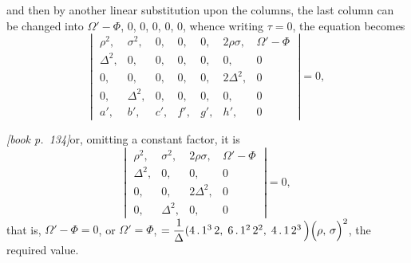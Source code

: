 \documentclass[11pt,a4paper]{article}
\theoremstyle{plain}
\theoremstyle{definition}
\theoremstyle{remark}
\begin{document}
and then by another linear substitution upon the columns, the last column can be changed into $\Omega' - \Phi$, $0$, $0$, $0$, $0$, $0$, whence writing $\tau = 0$, the equation becomes
\[
\left|\;\begin{array}{ccccccc}
\rho^{2},  & \sigma^{2}, & 0, & 0, & 0, & 2\rho\sigma, & \Omega' - \Phi\\
\Delta^{2}, & 0,         & 0, & 0, & 0, & 0,           & 0\\
0,         & 0,          & 0, & 0, & 0, & 2\Delta^{2}, & 0\\
0,         & \Delta^{2}, & 0, & 0, & 0, & 0,           & 0\\
a',        & b',         & c',& f',& g',& h',          & 0
\end{array}\;\right| = 0,
\]

\medskip\noindent\textit{[book p.~134]}\quad or, omitting a constant factor, it is
\[
\left|\;\begin{array}{cccc}
\rho^{2}, & \sigma^{2}, & 2\rho\sigma, & \Omega' - \Phi\\
\Delta^{2}, & 0, & 0, & 0\\
0, & 0, & 2\Delta^{2}, & 0\\
0, & \Delta^{2}, & 0, & 0
\end{array}\;\right| = 0,
\]
that is, $\Omega' - \Phi = 0$, or $\Omega' = \Phi$, $= \dfrac{1}{\Delta}(4\,.\,1^3\,2,\;6\,.\,1^2\,2^2,\;4\,.\,1\,2^{3}\,\Bigl)\Bigl(\rho,\,\sigma\Bigr)^2$, the required value.
\end{document}
